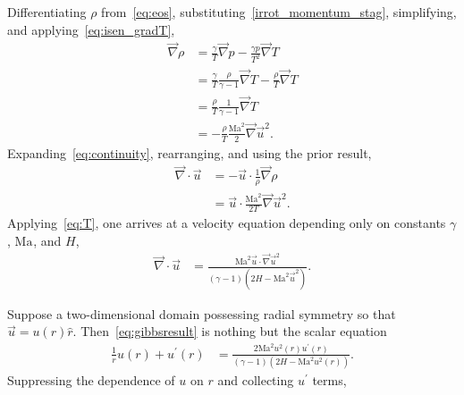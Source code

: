 \documentclass[letterpaper,11pt,nointlimits,reqno]{amsart}
\newcommand{\Mach}[1][]{\mbox{Ma}_{#1}}
\begin{document}
Differentiating $\rho$ from~\eqref{eq:eos},
substituting~\eqref{irrot_momentum_stag}, simplifying,
and applying~\eqref{eq:isen_gradT},
\begin{align}
  \vec{\nabla}\rho
  &=
  \frac{\gamma}{T} \vec{\nabla}p
  -
  \frac{\gamma p}{T^2} \vec{\nabla}T
\\&=
  \frac{\gamma}{T} \frac{\rho}{\gamma-1} \vec{\nabla}T
  -
  \frac{\rho}{T} \vec{\nabla}T
\\&=
  \frac{\rho}{T}
  \frac{1}{\gamma-1}
  \vec{\nabla}T
\\&=
  -
  \frac{\rho}{T}
  \frac{\Mach^2}{2}\vec{\nabla}\vec{u}^2.
\end{align}
Expanding~\eqref{eq:continuity}, rearranging, and using the prior result,
\begin{align}
  \vec{\nabla}\cdot\vec{u}
  &= -\vec{u}\cdot\frac{1}{\rho}\vec{\nabla}\rho
\\
  &= \vec{u}\cdot \frac{\Mach^2}{2T}\vec{\nabla}\vec{u}^2.
\end{align}
Applying~\eqref{eq:T}, one arrives at a velocity equation depending
only on constants $\gamma$, $\Mach$, and $H$,
\begin{align}
  \vec{\nabla}\cdot\vec{u}
  &= \frac{\Mach^2 \vec{u}\cdot \vec{\nabla}\vec{u}^2}
          {\left(\gamma-1\right)\left(2H - \Mach^2 \vec{u}^2\right)}.
  \label{eq:gibbsresult}
\end{align}

Suppose a two-dimensional domain possessing radial symmetry so that
$\vec{u}={u}\!\left(r\right)\hat{r}$. Then~\eqref{eq:gibbsresult} is nothing
but the scalar equation
\begin{align}
  \frac{1}{r}u\!\left(r\right) + u^\prime\!\left(r\right)
  &= \frac{2 \Mach^2 u^2\!\left(r\right) u^\prime\!\left(r\right)}
          {\left(\gamma-1\right)\left(2H - \Mach^2 u^2\!\left(r\right)\right)}.
\end{align}
Suppressing the dependence of $u$ on $r$ and collecting $u^\prime$ terms,



\newcommand*{\doi}[1]{\href{http://dx.doi.org/\detokenize{#1}}{doi: #1}}


\end{document}
